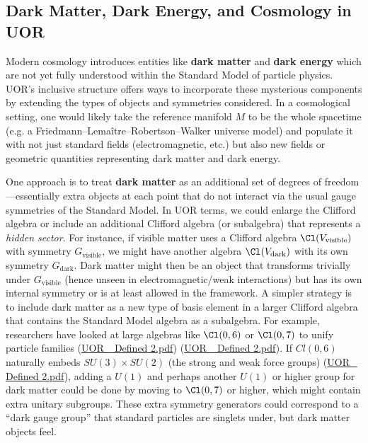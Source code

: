\documentclass[12pt]{article}
\begin{document}
\subsection{Dark Matter, Dark Energy, and Cosmology in UOR}

Modern cosmology introduces entities like \textbf{dark matter} and \textbf{dark energy} which are not yet fully understood within the Standard Model of particle physics. UOR’s inclusive structure offers ways to incorporate these mysterious components by extending the types of objects and symmetries considered. In a cosmological setting, one would likely take the reference manifold $M$ to be the whole spacetime (e.g. a Friedmann–Lema\^itre–Robertson–Walker universe model) and populate it with not just standard fields (electromagnetic, etc.) but also new fields or geometric quantities representing dark matter and dark energy.

\medskip

One approach is to treat \textbf{dark matter} as an additional set of degrees of freedom---essentially extra objects at each point that do not interact via the usual gauge symmetries of the Standard Model. In UOR terms, we could enlarge the Clifford algebra or include an additional Clifford algebra (or subalgebra) that represents a \emph{hidden sector}. For instance, if visible matter uses a Clifford algebra $\Cl(V_{\text{visible}})$ with symmetry $G_{\text{visible}}$, we might have another algebra $\Cl(V_{\text{dark}})$ with its own symmetry $G_{\text{dark}}$. Dark matter might then be an object that transforms trivially under $G_{\text{visible}}$ (hence unseen in electromagnetic/weak interactions) but has its own internal symmetry or is at least allowed in the framework. A simpler strategy is to include dark matter as a new type of basis element in a larger Clifford algebra that contains the Standard Model algebra as a subalgebra. For example, researchers have looked at large algebras like $\Cl(0,6)$ or $\Cl(0,7)$ to unify particle families (\href{file://file-TBF3nHDaRR5QeVMmwCFYkp#:~:text=%24Cl%280%2C6%29%24%20%28a%206,g}{UOR\_ Defined 2.pdf}) (\href{file://file-TBF3nHDaRR5QeVMmwCFYkp#:~:text=automorphisms%20,representations%20can%20be%20realized%20by}{UOR\_ Defined 2.pdf}). If $Cl(0,6)$ naturally embeds $SU(3)\times SU(2)$ (the strong and weak force groups) (\href{file://file-TBF3nHDaRR5QeVMmwCFYkp#:~:text=choice%20of%20Clifford%20algebra%20that,Researchers%20have%20explored}{UOR\_ Defined 2.pdf}), adding a $U(1)$ and perhaps another $U(1)$ or higher group for dark matter could be done by moving to $\Cl(0,7)$ or higher, which might contain extra unitary subgroups. These extra symmetry generators could correspond to a “dark gauge group” that standard particles are singlets under, but dark matter objects feel.
\end{document}
